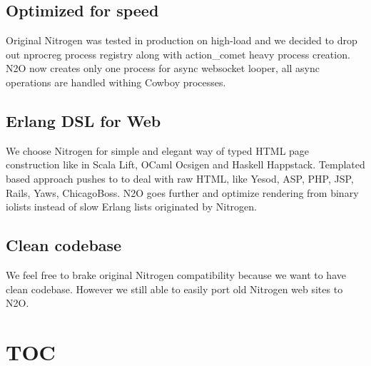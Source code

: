 \documentclass[11pt]{article}
\begin{document}
\subsection*{Optimized for speed}
Original Nitrogen was tested in production on high-load and we decided to drop out
nprocreg process registry along with action_comet heavy process creation. N2O now creates
only one process for async websocket looper, all async operations are handled withing
Cowboy processes.

\subsection*{Erlang DSL for Web}
We choose Nitrogen for simple and elegant way of typed HTML page construction like 
in Scala Lift, OCaml Ocsigen and Haskell Happstack.
Templated based approach pushes to to deal with raw HTML, like 
Yesod, ASP, PHP, JSP, Rails, Yaws, ChicagoBoss.
N2O goes further and optimize rendering from binary iolists instead of slow Erlang
lists originated by Nitrogen.


\subsection*{Clean codebase}
We feel free to brake original Nitrogen compatibility because we want to have clean codebase.
However we still able to easily port old Nitrogen web sites to N2O.



\section*{TOC}
\paragraph{}
 \@br
{} \@br
{} \@br
{} \@br
{} \@br

\end{document}
